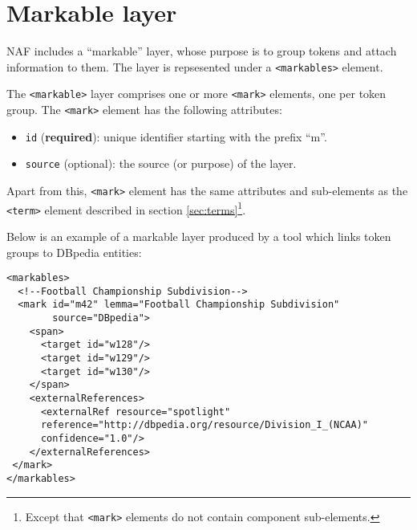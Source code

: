 \section{Markable layer}
\label{sec:markable-layer}

NAF includes a ``markable'' layer, whose purpose is to group tokens and
attach information to them. The layer is repsesented under a
\texttt{<markables>} element. 

The \texttt{<markable>} layer comprises one or more \texttt{<mark>}
elements, one per token group. The \texttt{<mark>} element has the following
attributes:
\begin{itemize}
\item \texttt{id} (\textbf{required}): unique identifier starting with the
  prefix ``m''.
\item \texttt{source} (optional): the source (or purpose) of the layer.
\end{itemize}

Apart from this, \texttt{<mark>} element has the same attributes and
sub-elements as the \texttt{<term>} element described in section
\ref{sec:terms}\footnote{Except that \texttt{<mark>} elements do not contain
  component sub-elements.}.

Below is an example of a markable layer produced by a tool which links token
groups to DBpedia entities:

\begin{Verbatim}[fontsize=\small]
<markables>
  <!--Football Championship Subdivision-->
  <mark id="m42" lemma="Football Championship Subdivision"
        source="DBpedia">
    <span>
      <target id="w128"/>
      <target id="w129"/>
      <target id="w130"/>
    </span>
    <externalReferences>
      <externalRef resource="spotlight"
      reference="http://dbpedia.org/resource/Division_I_(NCAA)"
      confidence="1.0"/>
    </externalReferences>
 </mark>
</markables>
\end{Verbatim}

